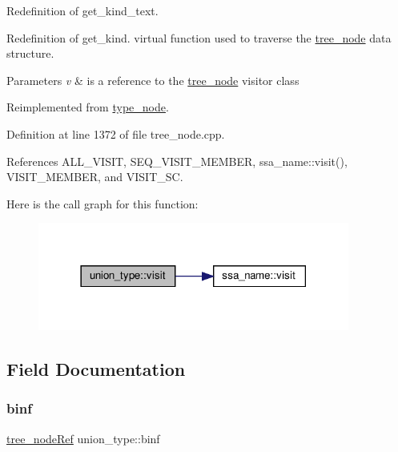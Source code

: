 Redefinition of get\+\_\+kind\+\_\+text. 

Redefinition of get\+\_\+kind. virtual function used to traverse the \hyperlink{classtree__node}{tree\+\_\+node} data structure. 
\begin{DoxyParams}{Parameters}
{\em v} & is a reference to the \hyperlink{classtree__node}{tree\+\_\+node} visitor class \\
\hline
\end{DoxyParams}


Reimplemented from \hyperlink{structtype__node_adc6e447af5f9505e6305320933c46a96}{type\+\_\+node}.



Definition at line 1372 of file tree\+\_\+node.\+cpp.



References A\+L\+L\+\_\+\+V\+I\+S\+IT, S\+E\+Q\+\_\+\+V\+I\+S\+I\+T\+\_\+\+M\+E\+M\+B\+ER, ssa\+\_\+name\+::visit(), V\+I\+S\+I\+T\+\_\+\+M\+E\+M\+B\+ER, and V\+I\+S\+I\+T\+\_\+\+SC.

Here is the call graph for this function\+:
\nopagebreak
\begin{figure}[H]
\begin{center}
\leavevmode
\includegraphics[width=290pt]{d6/dce/structunion__type_a6a6db754840c90dd94a29478df279e7b_cgraph}
\end{center}
\end{figure}


\subsection{Field Documentation}
\mbox{\label{structunion__type_a9b15f11bc4c65c5f7a34dfee2a01ad1f}} 
\subsubsection{\texorpdfstring{binf}{binf}}
{\footnotesize\ttfamily \hyperlink{tree__node_8hpp_a6ee377554d1c4871ad66a337eaa67fd5}{tree\+\_\+node\+Ref} union\+\_\+type\+::binf}



